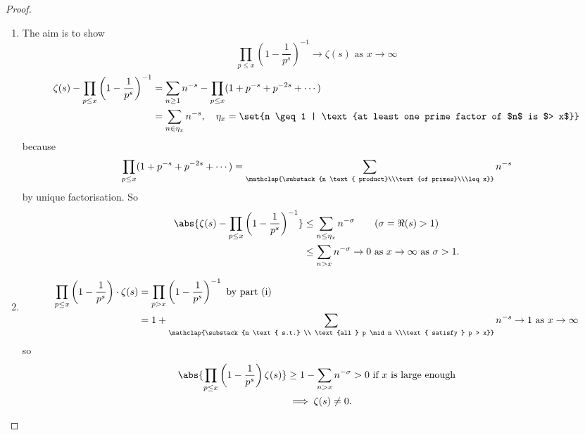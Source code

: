 \documentclass{article}
\begin{document}
\begin{proof}
    \begin{enumerate}[label=(\roman*)]
        \item The aim is to show
            \begin{equation*}
                \prod_{p \leq x} \left(1 - \frac{1}{p^s}\right)^{-1} \to \zeta(s) \text{ as } x \to \infty
            \end{equation*}
            \begin{align*}
                \zeta(s) - \prod_{p \leq x} \left(1 - \frac{1}{p^s}\right)^{-1} &= \sum_{n \geq 1} n^{-s} - \prod_{p \leq x} (1 + p^{-s} + p^{-2s} + \dotsb) \\
                                                                     &= \sum_{n \in \eta_x} n^{-s}, \quad \eta_x = \set{n \geq 1 | \text{at least one prime factor of $n$ is $> x$}}
            \end{align*}
        because \begin{equation*}\prod_{p \leq x} (1 + p^{-s} + p^{-2s} + \dotsb) = \sum_{\mathclap{\substack{n \text{ product}\\\text{of primes}\\\leq x}}} n^{-s}\end{equation*} by unique factorisation.
            So
            \begin{align*}
                \abs{\zeta(s) - \prod_{p \leq x} \left(1 - \frac{1}{p^s}\right)^{-1}} &\leq \sum_{n \leq \eta_x} n^{-\sigma} \tag{$\sigma = \Re(s) > 1$} \\
                                                                           &\leq \sum_{n > x} n^{-\sigma} \to 0 \text{ as } x \to \infty \text{ as } \sigma > 1.
            \end{align*}
        \item
            \begin{align*}
                \prod_{p \leq x} \left(1 - \frac{1}{p^s}\right) \cdot \zeta(s) &= \prod_{p > x} \left(1 - \frac{1}{p^s}\right)^{-1} \text{ by part (i)} \\
                                                                               &= 1 + \sum_{\mathclap{\substack{n \text{ s.t.} \\ \text{all } p \mid n \\\text{ satisfy } p > x}}} n^{-s} \to 1 \text{ as } x \to \infty
            \end{align*}
            so
            \begin{align*}
                \abs{\prod_{p \leq x} \left(1 - \frac{1}{p^s}\right) \zeta(s)} &\geq 1 - \sum_{n > x} n^{-\sigma} > 0 \text{ if $x$ is large enough} \\
                                                                               &\implies \zeta(s) \neq 0. \qedhere
            \end{align*}
    \end{enumerate}
\end{proof}
\end{document}
